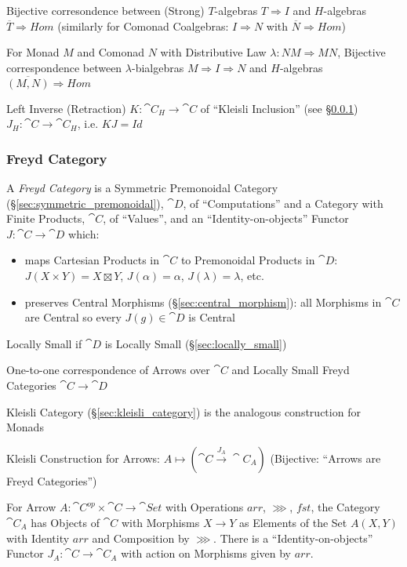 Bijective corresondence between (Strong) $T$-algebras $T \Rightarrow
I$ and $H$-algebras $\overline{T} \Rightarrow Hom$ (similarly for
Comonad Coalgebras: $I \Rightarrow N$ with $\overline{N} \Rightarrow
Hom$)

For Monad $M$ and Comonad $N$ with Distributive Law $\lambda : N M
\Rightarrow M N$, Bijective correspondence between
$\lambda$-bialgebras $M \Rightarrow I \Rightarrow N$ and $H$-algebras
$\overline{(M,N)} \Rightarrow Hom$

Left Inverse (Retraction) $K : \cat{C}_H \rightarrow \cat{C}$ of
``Kleisli Inclusion'' (see \S\ref{sec:freyd_category}) $J_H : \cat{C}
\rightarrow \cat{C}_H$, i.e. $K J = Id$



\subsubsection{Freyd Category}\label{sec:freyd_category}

A \emph{Freyd Category} is a Symmetric Premonoidal Category
(\S\ref{sec:symmetric_premonoidal}), $\cat{D}$, of
``Computations'' and a Category with Finite Products, $\cat{C}$, of
``Values'', and an ``Identity-on-objects'' Functor $J : \cat{C}
\rightarrow \cat{D}$ which:
\begin{itemize}
\item maps Cartesian Products in $\cat{C}$ to Premonoidal Products in
  $\cat{D}$: $J(X \times Y) = X \boxtimes Y$, $J(\alpha) = \alpha$,
  $J(\lambda) = \lambda$, etc.
\item preserves Central Morphisms (\S\ref{sec:central_morphism}): all
  Morphisms in $\cat{C}$ are Central so every $J(g) \in \cat{D}$ is
  Central
\end{itemize}
\cite{jacobs-heunen-hasuo09}

Locally Small if $\cat{D}$ is Locally Small
(\S\ref{sec:locally_small})

One-to-one correspondence of Arrows over $\cat{C}$ and Locally Small
Freyd Categories $\cat{C} \rightarrow \cat{D}$

Kleisli Category (\S\ref{sec:kleisli_category}) is the analogous
construction for Monads

Kleisli Construction for Arrows: $A \mapsto (\cat{C} \xrightarrow{J_A}
\cat{C}_A)$ (Bijective: ``Arrows are Freyd Categories'')

For Arrow $A : \cat{C}^{op} \times \cat{C} \rightarrow \cat{Set}$ with
Operations $arr$, $\ggg$, $fst$, the Category $\cat{C}_A$ has Objects
of $\cat{C}$ with Morphisms $X \rightarrow Y$ as Elements of the Set
$A(X,Y)$ with Identity $arr$ and Composition by $\ggg$. There is a
``Identity-on-objects'' Functor $J_A : \cat{C} \rightarrow \cat{C}_A$
with action on Morphisms given by $arr$.

